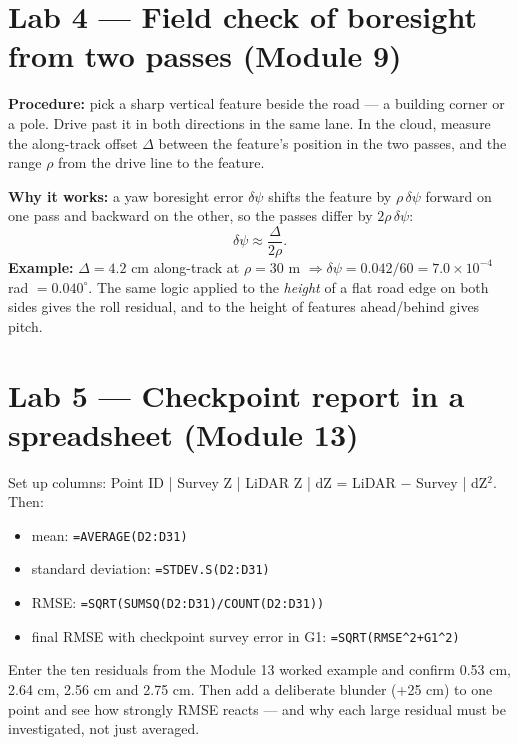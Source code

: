 \section*{Lab 4 --- Field check of boresight from two passes (Module 9)}
\begin{eng}
\textbf{Procedure:} pick a sharp vertical feature beside the road --- a building corner or a pole. Drive past it in both directions in the same lane. In the cloud, measure the along-track offset $\Delta$ between the feature's position in the two passes, and the range $\rho$ from the drive line to the feature.

\textbf{Why it works:} a yaw boresight error $\delta\psi$ shifts the feature by $\rho\,\delta\psi$ forward on one pass and backward on the other, so the passes differ by $2\rho\,\delta\psi$:
\[ \delta\psi\approx\frac{\Delta}{2\rho}. \]
\textbf{Example:} $\Delta=4.2$ cm along-track at $\rho=30$ m $\Rightarrow\delta\psi=0.042/60=7.0\times10^{-4}$ rad $=0.040^\circ$. The same logic applied to the \emph{height} of a flat road edge on both sides gives the roll residual, and to the height of features ahead/behind gives pitch.
\end{eng}

\section*{Lab 5 --- Checkpoint report in a spreadsheet (Module 13)}
\begin{eng}
Set up columns: \textsf{Point ID | Survey Z | LiDAR Z | dZ = LiDAR $-$ Survey | dZ$^2$}. Then:
\begin{itemize}
\item mean: \texttt{=AVERAGE(D2:D31)}
\item standard deviation: \texttt{=STDEV.S(D2:D31)}
\item RMSE: \texttt{=SQRT(SUMSQ(D2:D31)/COUNT(D2:D31))}
\item final RMSE with checkpoint survey error in G1: \texttt{=SQRT(RMSE\^{}2+G1\^{}2)}
\end{itemize}
Enter the ten residuals from the Module 13 worked example and confirm 0.53 cm, 2.64 cm, 2.56 cm and 2.75 cm. Then add a deliberate blunder (+25 cm) to one point and see how strongly RMSE reacts --- and why each large residual must be investigated, not just averaged.
\end{eng}
